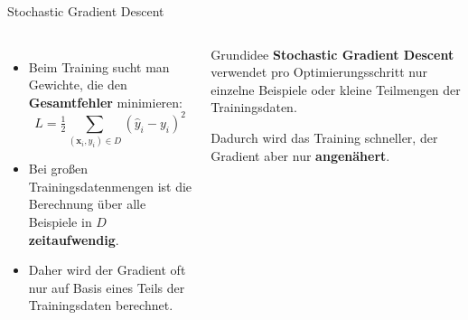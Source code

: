 \begin{frame}{Stochastic Gradient Descent}

\begin{columns}

\begin{itemize}
    \item Beim Training sucht man Gewichte, die den \textbf{Gesamtfehler}
          minimieren:
          \[
              L =
              \tfrac12\sum_{(\mathbf{x}_i,y_i)\in D}
              \left(\hat{y}_i - y_i\right)^2
          \]

    \item Bei großen Trainingsdatenmengen ist die Berechnung über alle
          Beispiele in $D$ \textbf{zeitaufwendig}.

    \item Daher wird der Gradient oft nur auf Basis eines Teils der
          Trainingsdaten berechnet.
\end{itemize}


\begin{blockC1}{Grundidee}
\textbf{Stochastic Gradient Descent} verwendet pro Optimierungsschritt nur
einzelne Beispiele oder kleine Teilmengen der Trainingsdaten.

\vspace{0.3cm}

Dadurch wird das Training schneller, der Gradient aber nur
\textbf{angenähert}.
\end{blockC1}

\end{columns}

\end{frame}


